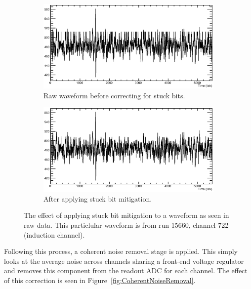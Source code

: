 \begin{figure}
  \centering
  \begin{subfigure}[t]{0.48\linewidth}
    \centering
    \includegraphics[width=\textwidth]{raw_stuck.eps}
    \caption{Raw waveform before correcting for stuck bits.}
    \label{fig:StuckBitWaveformStuck}
  \end{subfigure}
  \hfill
  \begin{subfigure}[t]{0.48\linewidth}
    \centering
    \includegraphics[width=\textwidth]{raw_unstuck.eps}
    \caption{After applying stuck bit mitigation.}
    \label{fig:StuckBitWaveformUnstuck}
  \end{subfigure}
  \caption[Raw data stuck bit mitigation]{The effect of applying stuck bit mitigation to a waveform as seen in raw data.  This particlular waveform is from run 15660, channel 722 (induction channel).}
  \label{fig:StuckBitWaveform}
\end{figure}

Following this process, a coherent noise removal stage is applied.  This simply looks at the average noise across channels sharing a front-end voltage regulator and removes this component from the readout ADC for each channel.  The effect of this correction is seen in Figure~\ref{fig:CoherentNoiseRemoval}.

